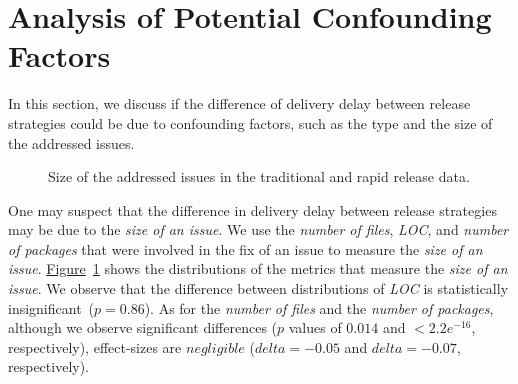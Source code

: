 \section{Analysis of Potential Confounding Factors} \label{sec:discussion}
In this section, we discuss if the difference of delivery delay between release
strategies could be due to confounding factors, such as the type and the size of
the addressed issues.\\
\begin{figure}
	\centering
	\caption{Size of the addressed issues in the traditional and rapid release data.}
	\label{fig:issue_granularity}
\end{figure}

\noindent\DIFdelbegin \textit{\textbf{}%
}%
\DIFdelend \DIFaddbegin {}
\DIFaddend One may suspect that the difference in delivery delay between release
strategies may be due to the \textit{size of an issue}. We use the
\textit{number of files}, \textit{LOC}, and \textit{number of packages} that
were involved in the fix of an issue to measure the \textit{size of an issue}.
\hyperref[fig:issue_granularity]{Figure}~\ref{fig:issue_granularity} shows the
distributions of the metrics that measure the \textit{size of an issue}.  We
observe that the difference between distributions of \textit{LOC} is
statistically insignificant~($p=0.86$). As for the \textit{number of files} and
the \textit{number of packages}, although we observe significant differences
($p$ values of $0.014$ and $<2.2e^{-16}$, respectively), effect-sizes are
$negligible$ ($delta=-0.05$ and $delta=-0.07$, respectively).\\

